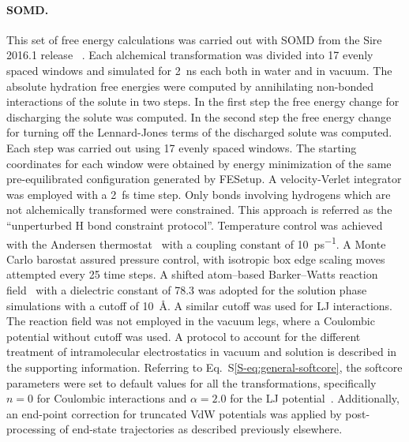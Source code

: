 \documentclass[journal=jctcce,manuscript=article]{achemso}
\begin{document}
\paragraph{SOMD.} 
This set of free energy calculations was carried out with SOMD from the Sire 2016.1 release ~\cite{Sire-2016, doi:10.1021/ct300857j}.
Each alchemical transformation was divided into 17 evenly spaced windows and simulated for \SI{2}{ns} each both in water and in vacuum. The absolute hydration free energies were computed by annihilating non-bonded interactions of the solute in two steps. In the first step the free energy change for discharging the solute was computed. In the second step the free energy change for turning off the Lennard-Jones terms of the discharged solute was computed. Each step was carried out using 17 evenly spaced windows. 
The starting coordinates for each window were obtained by energy minimization of the same pre-equilibrated configuration generated by FESetup. 
A velocity-Verlet integrator was employed with a \SI{2}{fs} time step.  
Only bonds involving hydrogens which are not alchemically transformed were constrained. This approach is referred as the ``unperturbed H bond constraint protocol''.
Temperature control was achieved with the Andersen thermostat~\cite{doi:10.1063/1.439486} with a coupling constant of \SI{10}{ps^{-1}}.  
A Monte Carlo barostat assured pressure control, with isotropic box edge scaling moves attempted every 25 time steps.
A shifted atom--based Barker--Watts reaction field~\cite{doi:10.1080/00268977300102101} with a dielectric constant of \num{78.3} was adopted for the solution phase simulations with a cutoff of \SI{10}{\angstrom}. A similar cutoff was used for LJ interactions. 
The reaction field was not employed in the vacuum legs, where a Coulombic potential without cutoff was used.  A protocol to account for the different treatment of intramolecular electrostatics in vacuum and solution is described in the supporting information.
Referring to Eq.~S\ref{S-eq:general-softcore}, the softcore parameters were set to default values for all the transformations, 
specifically $n = 0$ for Coulombic interactions and $\alpha = 2.0$ for the LJ potential~\cite{doi:10.1021/ct700081t}.  
Additionally, an end-point correction for truncated VdW potentials was applied by post-processing of end-state trajectories as described previously elsewhere.~\cite{shirtsLRC,BosisioHG}
\end{document}

